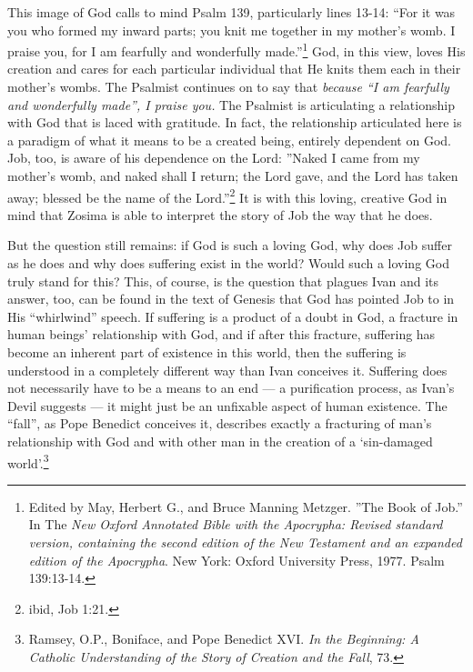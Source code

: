 This image of God calls to mind Psalm 139, particularly lines 13-14: ``For it was you who formed my inward parts; you knit me together in my mother's womb. I praise you, for I am fearfully and wonderfully made.''\footnote{Edited by May, Herbert G., and Bruce Manning Metzger. ''The Book of Job.'' In The \emph{New Oxford Annotated Bible with the Apocrypha: Revised standard version, containing the second edition of the New Testament and an expanded edition of the Apocrypha}. New York: Oxford University Press, 1977. Psalm 139:13-14.} God, in this view, loves His creation and cares for each particular individual that He knits them each in their mother's wombs. The Psalmist continues on to say that \emph{because ``I am fearfully and wonderfully made'', I praise you.} The Psalmist is articulating a relationship with God that is laced with gratitude. In fact, the relationship articulated here is a paradigm of what it means to be a created being, entirely dependent on God. Job, too, is aware of his dependence on the Lord: ''Naked I came from my mother's womb, and naked shall I return; the Lord gave, and the Lord has taken away; blessed be the name of the Lord.''\footnote{ibid, Job 1:21.} It is with this loving, creative God in mind that Zosima is able to interpret the story of Job the way that he does. 

But the question still remains: if God is such a loving God, why does Job suffer as he does and why does suffering exist in the world? Would such a loving God truly stand for this? This, of course, is the question that plagues Ivan and its answer, too, can be found in the text of Genesis that God has pointed Job to in His ``whirlwind'' speech. If suffering is a product of a doubt in God, a fracture in human beings' relationship with God, and if after this fracture, suffering has become an inherent part of existence in this world, then the suffering is understood in a completely different way than Ivan conceives it. Suffering does not necessarily have to be a means to an end --- a purification process, as Ivan's Devil suggests --- it might just be an unfixable aspect of human existence. The ``fall'', as Pope Benedict conceives it, describes exactly a fracturing of man's relationship with God and with other man in the creation of a `sin-damaged world'.\footnote{Ramsey, O.P., Boniface, and Pope Benedict XVI. \emph{In the Beginning: A Catholic Understanding of the Story of Creation and the Fall}, 73.}

